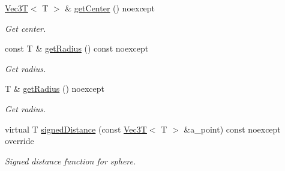 \begin{DoxyCompactItemize}
\mbox{\label{classSphereSDF_a4f3a9220bfe2fc817131f655ce6f30cd}} 
\hyperlink{classVec3T}{Vec3T}$<$ T $>$ \& \hyperlink{classSphereSDF_a4f3a9220bfe2fc817131f655ce6f30cd}{get\+Center} () noexcept
\begin{DoxyCompactList}\small\item\em Get center. \end{DoxyCompactList}\item 
\mbox{\label{classSphereSDF_a2cdc1f42f3de4c0ca017571910fbe72c}} 
const T \& \hyperlink{classSphereSDF_a2cdc1f42f3de4c0ca017571910fbe72c}{get\+Radius} () const noexcept
\begin{DoxyCompactList}\small\item\em Get radius. \end{DoxyCompactList}\item 
\mbox{\label{classSphereSDF_a09245289037ae77adf204160c0d5b9cc}} 
T \& \hyperlink{classSphereSDF_a09245289037ae77adf204160c0d5b9cc}{get\+Radius} () noexcept
\begin{DoxyCompactList}\small\item\em Get radius. \end{DoxyCompactList}\item 
virtual T \hyperlink{classSphereSDF_a9b0c5f0b1af2c4b62bee1c873e0158e8}{signed\+Distance} (const \hyperlink{classVec3T}{Vec3T}$<$ T $>$ \&a\+\_\+point) const noexcept override
\begin{DoxyCompactList}\small\item\em Signed distance function for sphere. \end{DoxyCompactList}\end{DoxyCompactItemize}
